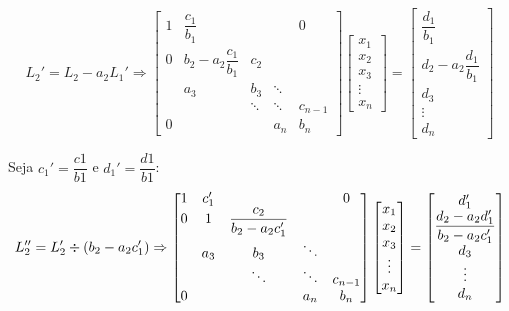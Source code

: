 \begin{equation*}
	L_2' = L_2 - a_2L_1'  \Rightarrow
	\begin{bmatrix}
		1 & \dfrac{c_1}{b_1} &         &        & 0\\
		0 & b_2 - a_2\dfrac{c_1}{b_1} &   c_2   &        & \\
		    & a_3 &   b_3   & \ddots & \\
		    &     &  \ddots & \ddots & c_{n-1} \\
	     0  &     &         &  a_n   & b_n 
	\end{bmatrix}
	\begin{bmatrix}
		x_1 \\
		x_2 \\
		x_3 \\
		\vdots \\
		x_n
	\end{bmatrix}
	=\begin{bmatrix}
		\dfrac{d_1}{b_1} \\
		d_2 - a_2\dfrac{d_1}{b_1}\\
		d_3 \\
		\vdots \\
		d_n
	\end{bmatrix}
\end{equation*}

Seja $c_1' = \dfrac{c1}{b1}$ e $d_1' = \dfrac{d1}{b1}$:
\begin{equation*}
	L_2'' = L_2'\divisionsymbol (b_2-a_2c_1')  \Rightarrow
	\begin{bmatrix}
		1 & c_1' &         &        & 0\\
		0 & 1 &   \dfrac{c_2}{b_2-a_2c_1'}   &        & \\
		    & a_3 &   b_3   & \ddots & \\
		    &     &  \ddots & \ddots & c_{n-1} \\
	     0  &     &         &  a_n   & b_n 
	\end{bmatrix}
	\begin{bmatrix}
		x_1 \\
		x_2 \\
		x_3 \\
		\vdots \\
		x_n
	\end{bmatrix}
	=\begin{bmatrix}
		d_1' \\
		\dfrac{d_2 - a_2d_1'}{b_2-a_2c_1'}\\
		d_3 \\
		\vdots \\
		d_n
	\end{bmatrix}
\end{equation*}

